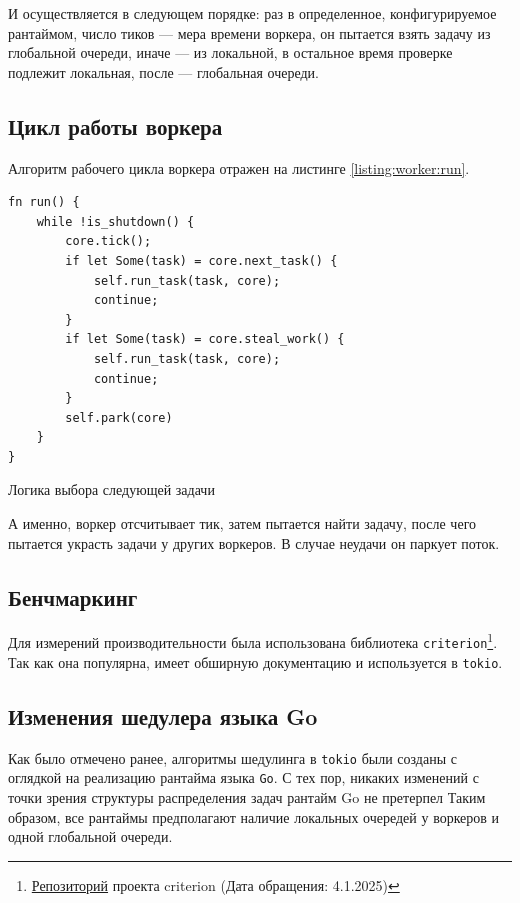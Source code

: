 И осуществляется в следующем порядке: раз в определенное, конфигурируемое рантаймом, число тиков --- мера времени воркера, он пытается взять задачу из глобальной очереди, иначе --- из локальной, в остальное время проверке подлежит локальная, после --- глобальная очереди.

\subsection{Цикл работы воркера}

Алгоритм рабочего цикла воркера отражен на листинге \ref{listing:worker:run}.

\begin{listing}[H]
    \begin{verbatim}
fn run() {
    while !is_shutdown() {
        core.tick();
        if let Some(task) = core.next_task() {
            self.run_task(task, core);
            continue;
        }
        if let Some(task) = core.steal_work() {
            self.run_task(task, core);
            continue;
        }
        self.park(core)
    }
}
    \end{verbatim}

    \caption{Логика выбора следующей задачи}
    \label{listing:worker:run}
\end{listing}

А именно, воркер отсчитывает тик, затем пытается найти задачу, после чего пытается украсть задачи у других воркеров. В случае неудачи он паркует поток.

\subsection{Бенчмаркинг}

Для измерений производительности была использована библиотека \verb|criterion|\footnote{\href{https://github.com/bheisler/criterion.rs}{Репозиторий} проекта criterion (Дата обращения: 4.1.2025)}. Так как она популярна, имеет обширную документацию и используется в \verb|tokio|.

\subsection{Изменения шедулера языка Go}

Как было отмечено ранее, алгоритмы шедулинга в \verb|tokio| были созданы с оглядкой на реализацию рантайма языка \verb|Go|. С тех пор, никаких изменений с точки зрения структуры распределения задач рантайм Go не претерпел Таким образом, все рантаймы предполагают наличие локальных очередей у воркеров и одной глобальной очереди.
